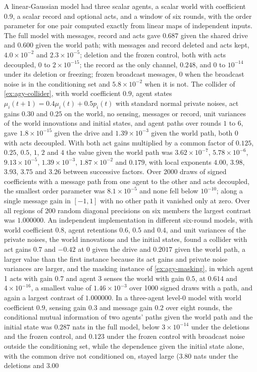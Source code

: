 \begin{numcheck}\label{chk:agy-nulls}
A linear-Gaussian model had three scalar agents, a scalar world with coefficient $0.9$, a scalar record and optional acts, and a window of six rounds, with the order parameter for one pair computed exactly from linear maps of independent inputs. The full model with messages, record and acts gave $0.687$ given the shared drive and $0.600$ given the world path; with messages and record deleted and acts kept, $4.0\times10^{-2}$ and $2.3\times10^{-5}$; deletion and the frozen control, both with acts decoupled, $0$ to $2\times10^{-15}$; the record as the only channel, $0.248$, and $0$ to $10^{-14}$ under its deletion or freezing; frozen broadcast messages, $0$ when the broadcast noise is in the conditioning set and $5.8\times10^{-2}$ when it is not. The collider of \cref{ex:agy-collider}, with world coefficient $0.9$, agent states $\mu_i(t+1)=0.4\mu_i(t)+0.5p_i(t)$ with standard normal private noises, act gains $0.30$ and $0.25$ on the world, no sensing, messages or record, unit variances of the world innovations and initial states, and agent paths over rounds $1$ to $6$, gave $1.8\times10^{-15}$ given the drive and $1.39\times10^{-3}$ given the world path, both $0$ with acts decoupled. With both act gains multiplied by a common factor of $0.125$, $0.25$, $0.5$, $1$, $2$ and $4$ the value given the world path was $3.62\times10^{-7}$, $5.78\times10^{-6}$, $9.13\times10^{-5}$, $1.39\times10^{-3}$, $1.87\times10^{-2}$ and $0.179$, with local exponents $4.00$, $3.98$, $3.93$, $3.75$ and $3.26$ between successive factors. Over 2000 draws of signed coefficients with a message path from one agent to the other and acts decoupled, the smallest order parameter was $8.1\times10^{-5}$ and none fell below $10^{-10}$; along a single message gain in $[-1,1]$ with no other path it vanished only at zero. Over all regions of 200 random diagonal precisions on six members the largest contrast was $1.000000$. An independent implementation in different six-round models, with world coefficient $0.8$, agent retentions $0.6$, $0.5$ and $0.4$, and unit variances of the private noises, the world innovations and the initial states, found a collider with act gains $0.7$ and $-0.42$ at $0$ given the drive and $0.2017$ given the world path, a larger value than the first instance because its act gains and private noise variances are larger, and the masking instance of \cref{ex:agy-masking}, in which agent 1 acts with gain $0.7$ and agent 3 senses the world with gain $0.5$, at $0.614$ and $4\times10^{-16}$, a smallest value of $1.46\times10^{-3}$ over 1000 signed draws with a path, and again a largest contrast of $1.000000$. In a three-agent level-0 model with world coefficient $0.9$, sensing gain $0.3$ and message gain $0.2$ over eight rounds, the conditional mutual information of two agents' paths given the world path and the initial state was $0.287$ nats in the full model, below $3\times10^{-14}$ under the deletions and the frozen control, and $0.123$ under the frozen control with broadcast noise outside the conditioning set, while the dependence given the initial state alone, with the common drive not conditioned on, stayed large ($3.80$ nats under the deletions and $3.00$ 
\end{numcheck}
